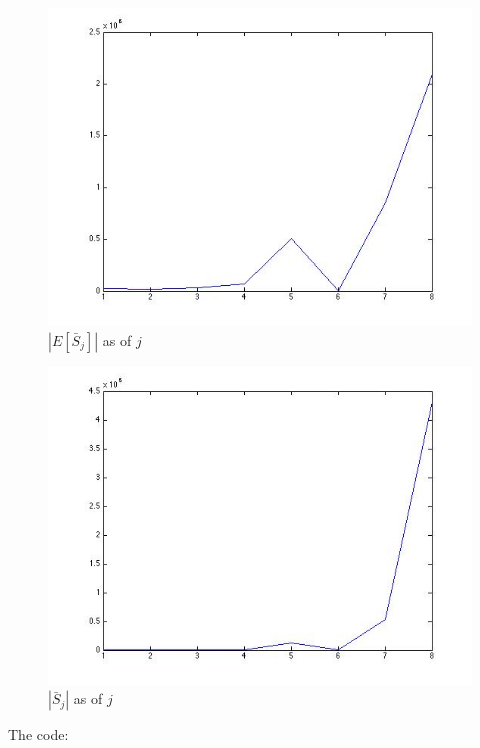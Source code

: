 \documentclass{article}
\begin{document}
\begin{figure}[H]
\centering
\includegraphics[scale=0.5]{q4c-esi.jpg}
\caption{ $|E[\bar S_j]|$ as of $j$}
\label{}
\end{figure}

\begin{figure}[H]
\centering
\includegraphics[scale=0.5]{q4c-si.jpg}
\caption{ $|\bar S_j|$ as of $j$}
\label{}
\end{figure}

The code:
\end{document}
